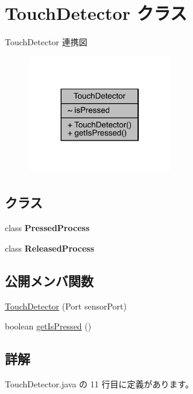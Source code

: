 \hypertarget{class_touch_detector}{}\section{Touch\+Detector クラス}
\label{class_touch_detector}


Touch\+Detector 連携図\nopagebreak
\begin{figure}[H]
\begin{center}
\leavevmode
\includegraphics[width=176pt]{db/d4a/class_touch_detector__coll__graph}
\end{center}
\end{figure}
\subsection*{クラス}
\begin{DoxyCompactItemize}
\item 
class {\bfseries Pressed\+Process}
\item 
class {\bfseries Released\+Process}
\end{DoxyCompactItemize}
\subsection*{公開メンバ関数}
\begin{DoxyCompactItemize}
\item 
\mbox{\hyperlink{class_touch_detector_ad4818fd917a3b42985865c4e2000c3c0}{Touch\+Detector}} (Port sensor\+Port)
\item 
boolean \mbox{\hyperlink{class_touch_detector_a118eac6be889816032f993694a8dd808}{get\+Is\+Pressed}} ()
\end{DoxyCompactItemize}


\subsection{詳解}


 Touch\+Detector.\+java の 11 行目に定義があります。



